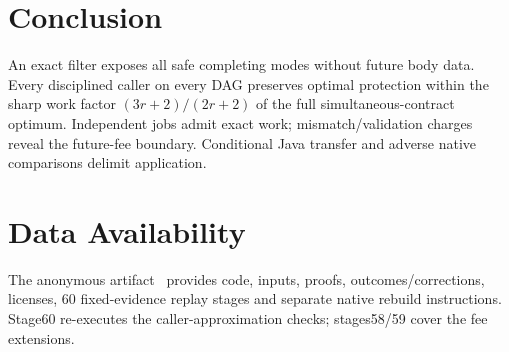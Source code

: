 \documentclass[acmsmall,screen,review,anonymous]{acmart}
\begin{document}
\section{Conclusion}

An exact filter exposes all safe completing modes without future body data. Every disciplined caller on every DAG preserves optimal protection within the sharp work factor $(3r+2)/(2r+2)$ of the full simultaneous-contract optimum. Independent jobs admit exact work; mismatch/validation charges reveal the future-fee boundary. Conditional Java transfer and adverse native comparisons delimit application.

\section*{Data Availability}
The anonymous artifact~\cite{residualartifact} provides code, inputs, proofs, outcomes/corrections, licenses, 60 fixed-evidence replay stages and separate native rebuild instructions. Stage60 re-executes the caller-approximation checks; stages58/59 cover the fee extensions.
\end{document}
